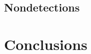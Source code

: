 \documentclass[twocolumn]{aastex631}
\begin{document}

                
                

                    
        \subsection{Nondetections}\label{subsec:Nondetections}

    \section{Conclusions}\label{sec:Conclusions}


    \vspace{5mm}
\end{document}
